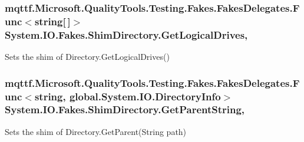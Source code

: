 \hypertarget{class_system_1_1_i_o_1_1_fakes_1_1_shim_directory_afacb8133ab242a0d276dc8cab6232ba5}{
\subsubsection[{Get\-Logical\-Drives}]{\setlength{\rightskip}{0pt plus 5cm}mqttf.\-Microsoft.\-Quality\-Tools.\-Testing.\-Fakes.\-Fakes\-Delegates.\-Func$<$string\mbox{[}$\,$\mbox{]}$>$ System.\-I\-O.\-Fakes.\-Shim\-Directory.\-Get\-Logical\-Drives\hspace{0.3cm}{\ttfamily [static]}, {\ttfamily [set]}}}\label{class_system_1_1_i_o_1_1_fakes_1_1_shim_directory_afacb8133ab242a0d276dc8cab6232ba5}


Sets the shim of Directory.\-Get\-Logical\-Drives()

\hypertarget{class_system_1_1_i_o_1_1_fakes_1_1_shim_directory_aa3c267f14ca72761bba7ba5167976e78}{
\subsubsection[{Get\-Parent\-String}]{\setlength{\rightskip}{0pt plus 5cm}mqttf.\-Microsoft.\-Quality\-Tools.\-Testing.\-Fakes.\-Fakes\-Delegates.\-Func$<$string, global.\-System.\-I\-O.\-Directory\-Info$>$ System.\-I\-O.\-Fakes.\-Shim\-Directory.\-Get\-Parent\-String\hspace{0.3cm}{\ttfamily [static]}, {\ttfamily [set]}}}\label{class_system_1_1_i_o_1_1_fakes_1_1_shim_directory_aa3c267f14ca72761bba7ba5167976e78}


Sets the shim of Directory.\-Get\-Parent(\-String path)

